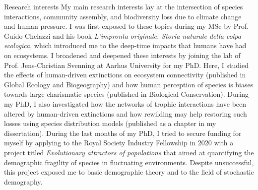\documentclass{resume} %
\begin{document}
\begin{rSection}{Research interests}
My main research interests lay at the intersection of species interactions, community assembly, and biodiversity loss due to climate change and human pressure.
I was first exposed to these topics during my MSc by Prof. Guido Chelazzi and his book \textit{L'impronta originale. Storia naturale della colpa ecologica}, which introduced me to the deep-time impacts that humans have had on ecosystems.
I broadened and deepened these interests by joining the lab of Prof. Jens-Christian Svenning at Aarhus University for my PhD.
Here, I studied the effects of human-driven extinctions on ecosystem connectivity (published in Global Ecology and Biogeography) and how human perception of species is biases towards large charismatic species (published in Biological Conservation).
During my PhD, I also investigated how the networks of trophic interactions have been altered by human-driven extinctions and how rewilding may help restoring such losses using species distribution models (published as a chapter in my dissertation).
During the last months of my PhD, I tried to secure funding for myself by applying to the Royal Society Industry Fellowship in 2020 with a project titled \textit{Evolutionary attractors of populations} that aimed at quantifying the demographic fragility of species in fluctuating environments.
Despite unsuccessful, this project exposed me to basic demographic theory and to the field of stochastic demography.


\end{rSection}
\end{document}
